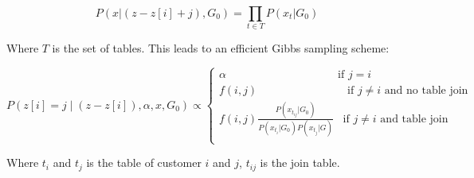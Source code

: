 \begin{equation}
    P(x | (z - z[i] + j), G_0) = \prod_{t \in T} P(x_t | G_0)
\end{equation}

Where $T$ is the set of tables. This leads to an efficient Gibbs sampling scheme:

\begin{equation}
     P(z[i] = j \;|\; (z - z[i]), \alpha, x, G_0) \propto \left\{
    \begin{array}{ll}
        \alpha \;\;\;\;\;\;\;\;\;\;\;\;\;\;\;\;\;\;\;\;\;\;\;\;\;\;\;\;\;\;\;\;\;\;\;\; \text{if $j = i$}\\
        f(i, j) \;\;\;\;\;\;\;\;\;\;\;\;\;\;\;\;\;\;\;\;\;\;\;\;\;\;\;\;\; \text{if $j \neq i$ and no table join}\\
        f(i, j) \frac{P(x_{t_{ij}} | G_0)}{P(x_{t_i} | G_0) P(x_{t_j} | G)} \;\;\; \text{if $j \neq i$ and  table join}\\
    \end{array}
    \right.
    \label{eq:gibbs}
\end{equation}

Where $t_i$ and $t_j$ is the table of customer $i$ and $j$, $t_{ij}$ is the join table.